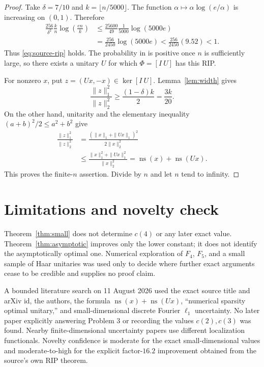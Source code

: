 \documentclass[11pt]{article}
\theoremstyle{remark}
\newcommand{\ns}{\operatorname{ns}}
\newcommand{\1}{\mathbf 1}
\begin{document}
\begin{proof}
Take $\delta=7/10$ and $k=\lfloor n/5000\rfloor$.  The function
$\alpha\mapsto\alpha\log(e/\alpha)$ is increasing on $(0,1)$.  Therefore
\begin{align*}
 \frac{256}{\delta^2}\frac{k}{n}\log\!\left(\frac{en}{k}\right)
 &\le \frac{25600}{49}\frac1{5000}\log(5000e)\\
 &=\frac{256}{2450}\log(5000e)
 <\frac{256}{2450}(9.52)<1.
\end{align*}
Thus \eqref{eq:source-rip} holds.  The probability in \cite[Theorem 8]{BLM}
is positive once $n$ is sufficiently large, so there exists a unitary $U$
for which $\Phi=[I\ U]$ has this RIP.

For nonzero $x$, put $z=(Ux,-x)\in\ker[I\ U]$.  Lemma~\ref{lem:width}
gives
\[
 \frac{\|z\|_1^2}{\|z\|_2^2}\ge\frac{(1-\delta)k}{2}=\frac{3k}{20}.
\]
On the other hand, unitarity and the elementary inequality
$(a+b)^2/2\le a^2+b^2$ give
\begin{align*}
 \frac{\|z\|_1^2}{\|z\|_2^2}
 &=\frac{(\|x\|_1+\|Ux\|_1)^2}{2\|x\|_2^2}\\
 &\le\frac{\|x\|_1^2+\|Ux\|_1^2}{\|x\|_2^2}
 =\ns(x)+\ns(Ux).
\end{align*}
This proves the finite-$n$ assertion.  Divide by $n$ and let $n$ tend to
infinity.
\end{proof}

\section{Limitations and novelty check}

Theorem~\ref{thm:small} does not determine $c(4)$ or any later exact value.
Theorem~\ref{thm:asymptotic} improves only the lower constant; it does not
identify the asymptotically optimal one.  Numerical exploration of $F_4$,
$F_5$, and a small sample of Haar unitaries was used only to decide where
further exact arguments cease to be credible and supplies no proof claim.

A bounded literature search on 11 August 2026 used the exact source title and
arXiv id, the authors, the formula $\ns(x)+\ns(Ux)$, ``numerical sparsity
optimal unitary,'' and small-dimensional discrete Fourier $\ell_1$
uncertainty.  No later paper explicitly answering Problem 3 or recording the
values $c(2),c(3)$ was found.  Nearby finite-dimensional uncertainty papers use
different localization functionals.  Novelty confidence is moderate for the
exact small-dimensional values and moderate-to-high for the explicit
factor-$16.2$ improvement obtained from the source's own RIP theorem.
\end{document}
